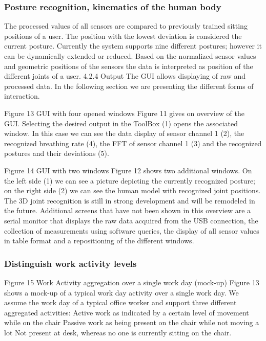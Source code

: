 \subsubsection*{Posture recognition, kinematics of the human body}
The processed values of all sensors are compared to previously trained sitting positions of a user. The position with the lowest deviation is considered the current posture. Currently the system supports nine different postures; however it can be dynamically extended or reduced.
Based on the normalized sensor values and geometric positions of the sensors the data is interpreted as position of the different joints of a user. 
4.2.4	Output
The GUI allows displaying of raw and processed data. In the following section we are presenting the different forms of interaction.
 
Figure 13 GUI with four opened windows
Figure 11 gives on overview of the GUI. Selecting the desired output in the ToolBox (1) opens the associated window. In this case we can see the data display of sensor channel 1 (2), the recognized breathing rate (4), the FFT of sensor channel 1 (3) and the recognized postures and their deviations (5).
 
Figure 14 GUI with two windows
Figure 12 shows two additional windows. On the left side (1) we can see a picture depicting the currently recognized posture; on the right side (2) we can see the human model with recognized joint positions. The 3D joint recognition is still in strong development and will be remodeled in the future.
Additional screens that have not been shown in this overview are a serial monitor that displays the raw data acquired from the USB connection, the collection of measurements using software queries, the display of all sensor values in table format and a repositioning of the different windows.
\subsubsection*{Distinguish work activity levels}
 
Figure 15 Work Activity aggregation over a single work day (mock-up)
Figure 13 shows a mock-up of a typical work day activity over a single work day. We assume the work day of a typical office worker and support three different aggregated activities: 
Active work as indicated by a certain level of movement while on the chair
Passive work as being present on the chair while not moving a lot
Not present at desk, whereas no one is currently sitting on the chair.


